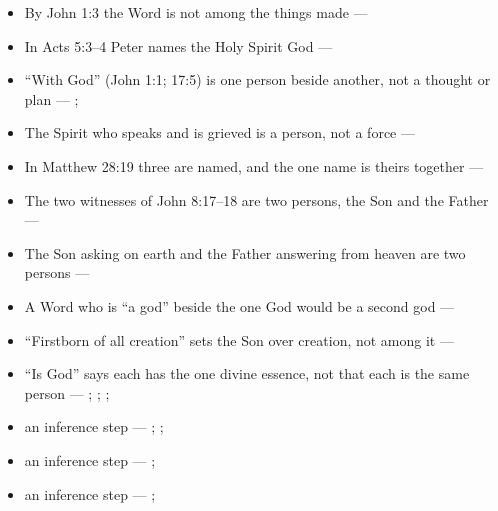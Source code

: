 \documentclass[11pt,paper=\testimonypaper,DIV=13,parskip=false]{scrartcl}
\begin{document}
\begin{itemize}
\begin{itemize}
\item By John 1:3 the Word is not among the things made --- \cite[Tractates on John I.11]{schaff-nicene-post-nicene-fathers-1-7}
\item In Acts 5:3–4 Peter names the Holy Spirit God --- \cite[198]{calvin-commentary-acts-1844}
\item “With God” (John 1:1; 17:5) is one person beside another, not a thought or plan --- \cite[3, The Triune God]{kibbey-living-systematic-theology-2026}; \cite[27]{watchtower-should-you-believe-trinity-1989}
\item The Spirit who speaks and is grieved is a person, not a force --- \cite[3, The Triune God]{kibbey-living-systematic-theology-2026}
\item In Matthew 28:19 three are named, and the one name is theirs together --- \cite[3, The Triune God]{kibbey-living-systematic-theology-2026}
\item The two witnesses of John 8:17–18 are two persons, the Son and the Father --- \cite[Against Praxeas 22]{roberts-ante-nicene-fathers-3-1885}
\item The Son asking on earth and the Father answering from heaven are two persons --- \cite[Against Praxeas 23]{roberts-ante-nicene-fathers-3-1885}
\item A Word who is “a god” beside the one God would be a second god --- \cite[75]{metzger-jehovahs-witnesses-jesus-christ-1953}
\item “Firstborn of all creation” sets the Son over creation, not among it --- \cite[Against the Arians II.62–63]{schaff-nicene-post-nicene-fathers-2-4-1892}
\item “Is God” says each has the one divine essence, not that each is the same person --- \cite[Letter 214, §4]{schaff-nicene-post-nicene-fathers-2-8-1895}; \cite[Letter 236, §6]{schaff-nicene-post-nicene-fathers-2-8-1895}; \cite[The Creed of Nicaea]{schaff-nicene-post-nicene-fathers-2-14-1900}; \cite[Against Praxeas 25]{roberts-ante-nicene-fathers-3-1885}
\item an inference step --- \cite[3, The Triune God]{kibbey-living-systematic-theology-2026}; \cite[ch. 4, Conclusion]{bernard-oneness-of-god-1983}; \cite[17--19]{buzzard-caveat-lector-2001}
\item an inference step --- \cite[Tractates on John 121.5]{schaff-nicene-post-nicene-fathers-1-7}; \cite[71]{metzger-jehovahs-witnesses-jesus-christ-1953}
\item an inference step --- \cite[on Hebrews 1:8]{calvin-hebrews-1853}; \cite{new-world-translation-2013}

\end{itemize}
\end{itemize}
\end{document}
